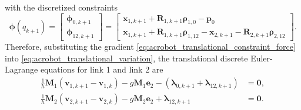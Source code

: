 with the discretized constraints
\begin{equation}
    \bm{\phi}(q_{k+1})
    =
    \begin{bmatrix}
        \bm{\phi}_{0,k+1} \\
        \bm{\phi}_{12,k+1}
    \end{bmatrix}
    =
    \begin{bmatrix}
    \bm{x}_{1,k+1}
    +
    \bm{R}_{1,k+1}\bm{\rho}_{1,0}
    -
    \bm{p}_0
    \\
    \bm{x}_{1,k+1}
    +
    \bm{R}_{1,k+1}\bm{\rho}_{1,12}
    -
    \bm{x}_{2,k+1}
    -
    \bm{R}_{2,k+1}\bm{\rho}_{2,12}
    \end{bmatrix}.
    \label{eq:acrobot_discrete_constraints_vector}
\end{equation}
Therefore, substituting the gradient \eqref{eq:acrobot_translational_constraint_force} into \eqref{eq:acrobot_translational_variation}, the translational discrete Euler-Lagrange equations for link 1 and link 2 are
\begin{subequations}
\label{eq:acrobot_translational_del_links}
\begin{align}
    \frac{1}{h}\bm{M}_{1}
    \left(
    \bm{v}_{1,k+1}
    -
    \bm{v}_{1,k}
    \right)
    -
    g\bm{M}_{1}\bm{e}_{2}
    -
    \left(
    \bm{\lambda}_{0,k+1}
    +
    \bm{\lambda}_{12,k+1}
    \right)
    &=
    \bm{0},
    \label{eq:acrobot_translational_del_link_1}
    \\
    \frac{1}{h}\bm{M}_{2}
    \left(
    \bm{v}_{2,k+1}
    -
    \bm{v}_{2,k}
    \right)
    -
    g\bm{M}_{2}\bm{e}_{2}
    +
    \bm{\lambda}_{12,k+1}
    &=
    \bm{0}.
    \label{eq:acrobot_translational_del_link_2}
\end{align}
\end{subequations}

